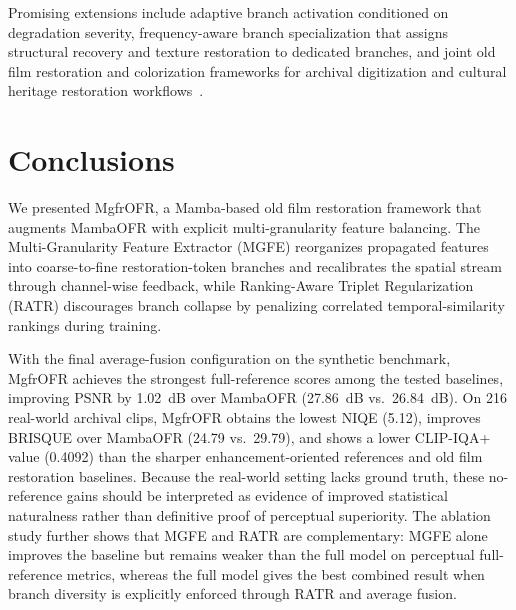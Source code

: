 Promising extensions include adaptive branch activation conditioned on degradation severity, frequency-aware branch specialization that assigns structural recovery and texture restoration to dedicated branches, and joint old film restoration and colorization frameworks for archival digitization and cultural heritage restoration workflows~\cite{kokaram2004missing}.
\section{Conclusions}
\label{sec:conclusion}

We presented MgfrOFR, a Mamba-based old film restoration framework that augments MambaOFR with explicit multi-granularity feature balancing. The Multi-Granularity Feature Extractor (MGFE) reorganizes propagated features into coarse-to-fine restoration-token branches and recalibrates the spatial stream through channel-wise feedback, while Ranking-Aware Triplet Regularization (RATR) discourages branch collapse by penalizing correlated temporal-similarity rankings during training.

With the final average-fusion configuration on the synthetic benchmark, MgfrOFR achieves the strongest full-reference scores among the tested baselines, improving PSNR by 1.02~dB over MambaOFR (27.86~dB vs.\ 26.84~dB). On 216 real-world archival clips, MgfrOFR obtains the lowest NIQE (5.12), improves BRISQUE over MambaOFR (24.79 vs.\ 29.79), and shows a lower CLIP-IQA+ value (0.4092) than the sharper enhancement-oriented references and old film restoration baselines. Because the real-world setting lacks ground truth, these no-reference gains should be interpreted as evidence of improved statistical naturalness rather than definitive proof of perceptual superiority. The ablation study further shows that MGFE and RATR are complementary: MGFE alone improves the baseline but remains weaker than the full model on perceptual full-reference metrics, whereas the full model gives the best combined result when branch diversity is explicitly enforced through RATR and average fusion.

